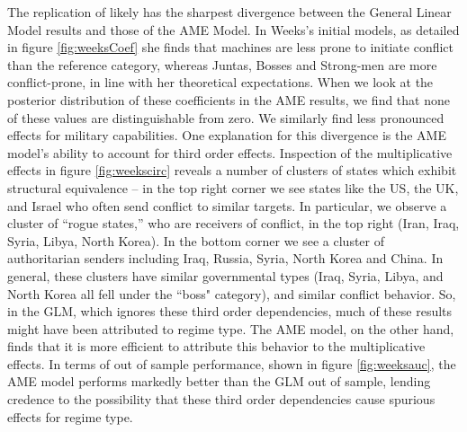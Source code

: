 The replication of \citet{weeks:2012} likely has the sharpest divergence between the General Linear Model results and those of the AME Model. In Weeks's initial models, as detailed in figure \ref{fig:weeksCoef} she finds that machines are less prone to initiate conflict than the reference category, whereas Juntas, Bosses and Strong-men are more conflict-prone, in line with her theoretical expectations. When we look at the posterior distribution of these coefficients in the AME results, we find that none of these values are distinguishable from zero. We similarly find less pronounced effects for military capabilities. One explanation for this divergence is the AME model's ability to account for third order effects. Inspection of the multiplicative effects in figure \ref{fig:weekscirc} reveals a number of clusters of states which exhibit structural equivalence -- in the top right corner we see states like the US, the UK, and Israel who often send conflict to similar targets. In particular, we observe a cluster of ``rogue states,'' who are receivers of conflict, in the top right (Iran, Iraq, Syria, Libya, North Korea). In the bottom corner we see a cluster of authoritarian senders including Iraq, Russia, Syria, North Korea and China. In general, these clusters have similar governmental types (Iraq, Syria, Libya, and North Korea all fell under the ``boss" category), and similar conflict behavior. So, in the GLM, which ignores these third order dependencies, much of these results might have been attributed to regime type. The AME model, on the other hand, finds that it is more efficient to attribute this behavior to the multiplicative effects. In terms of out of sample performance, shown in figure \ref{fig:weeksauc}, the AME model performs markedly better than the GLM out of sample, lending credence to the possibility that these third order dependencies cause spurious effects for regime type.

